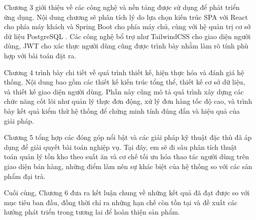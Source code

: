 \documentclass[../20232006p.tex]{subfiles}
\begin{document}
Chương 3 giới thiệu về các công nghệ và nền tảng được sử dụng để phát triển ứng dụng. Nội dung chương sẽ phân tích lý do lựa chọn kiến trúc SPA với React \cite{react} cho phía máy khách và Spring Boot \cite{springboot} cho phía máy chủ, cùng với hệ quản trị cơ sở dữ liệu PostgreSQL \cite{postgresql}. Các công nghệ bổ trợ như TailwindCSS \cite{tailwindcss} cho giao diện người dùng, JWT \cite{jwt} cho xác thực người dùng cũng được trình bày nhằm làm rõ tính phù hợp với bài toán đặt ra.

Chương 4 trình bày chi tiết về quá trình thiết kế, hiện thực hóa và đánh giá hệ thống. Nội dung bao gồm các thiết kế kiến trúc tổng thể, thiết kế cơ sở dữ liệu, và thiết kế giao diện người dùng. Phần này cũng mô tả quá trình xây dựng các chức năng cốt lõi như quản lý thực đơn động, xử lý đơn hàng tốc độ cao, và trình bày kết quả kiểm thử hệ thống để chứng minh tính đúng đắn và hiệu quả của giải pháp.

Chương 5 tổng hợp các đóng góp nổi bật và các giải pháp kỹ thuật đặc thù đã áp dụng để giải quyết bài toán nghiệp vụ. Tại đây, em sẽ đi sâu phân tích thuật toán quản lý tồn kho theo suất ăn và cơ chế tối ưu hóa thao tác người dùng trên giao diện bán hàng, những điểm làm nên sự khác biệt của hệ thống so với các sản phẩm đại trà.

Cuối cùng, Chương 6 đưa ra kết luận chung về những kết quả đã đạt được so với mục tiêu ban đầu, đồng thời chỉ ra những hạn chế còn tồn tại và đề xuất các hướng phát triển trong tương lai để hoàn thiện sản phẩm.
\end{document}
